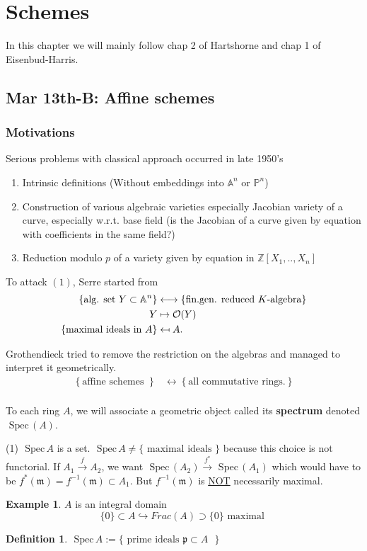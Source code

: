 \documentclass[11pt]{article}
\theoremstyle{definition}
\newtheorem{dfn}[thm]{Definition}
\newtheorem{ex}[thm]{Example}
\newcommand{\spec}{\text{ Spec}\,}
\newcommand{\affn}{\mathbb A}
\newcommand{\proj}{\mathbb P}
\newcommand{\intg}{\mathbb Z}
\newcommand{\scm}{{\mathfrak m}}
\newcommand{\scp}{{\mathfrak p}}
\newcommand{\calo}{{\cal O}}
\newcommand{\lrta}{\longrightarrow}
\newcommand{\llrta}{\longleftrightarrow}
\newcommand{\inj}{\hookrightarrow}
\begin{document}
\section{Schemes}
In this chapter we will mainly follow chap 2 of Hartshorne and chap 1 of Eisenbud-Harris.
\subsection{Mar 13th-B: Affine schemes}
\subsubsection{Motivations}
Serious problems with classical approach occurred in late 1950's
\begin{enumerate}[label=(\arabic*)]
\item Intrinsic definitions (Without embeddings into $\affn^n$ or $\proj^n$)
\item Construction of various algebraic varieties especially Jacobian variety of a curve, especially w.r.t. base field (is the Jacobian of a curve given by equation with coefficients in the same field?)
\item Reduction modulo $p$ of a variety given by equation in $\intg[X_1,..,X_n]$
\end{enumerate}
To attack $(1)$, Serre started from
$$
\begin{aligned}
\left\{\text{alg. set }Y\subset \affn^n \right\}&\llrta \left\{\text{fin.gen. reduced $K$-algebra}\right\}\\
Y&\mapsto \calo(Y)\\
\{\text{maximal ideals in $A$}\}&\mapsfrom A.
\end{aligned}
$$

Grothendieck tried to remove the restriction on the algebras and managed to interpret it geometrically.
$$
\begin{aligned}
\left\{\text{affine schemes }\right\}&\llrta \left\{\text{all commutative rings.}\right\}\\
\end{aligned}
$$

To each ring $A$, we will associate a geometric object called its \textbf{spectrum} denoted $\spec(A)$.

(1) $\spec A$ is a set. 
$\spec A\neq \{\text{ maximal ideals }\}$ because this choice is not functorial. If $A_1\overset{f}{\lrta} A_2$, we want $\spec(A_2)\overset{f^*}{\lrta}\spec(A_1)$ which would have to be $f^*(\scm)=f^{-1}(\scm)\subset A_1$. But $f^{-1}(\scm)$ is \underline{NOT} necessarily maximal.
\begin{ex}
$A$ is an integral domain
$$
\{0\}\subset A\inj Frac(A)\supset\{0\}\text{ maximal }
$$
\end{ex}
\begin{dfn}
$\spec A:=\{\text{ prime ideals $\scp\subset A$ }\}$
\end{dfn}
\end{document}
